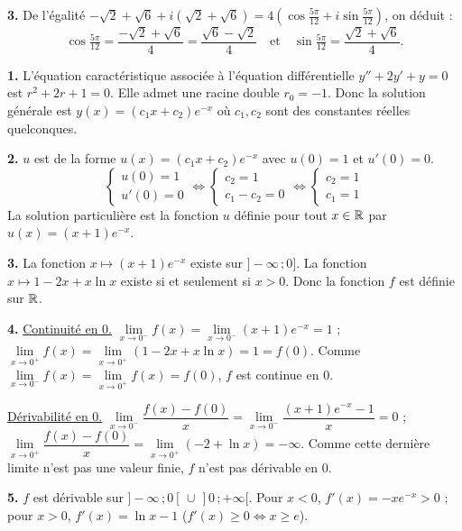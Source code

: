 \documentclass[11pt]{article}
\begin{document}
\textbf{3.} De l'égalité $-\sqrt{2} + \sqrt{6} + i(\sqrt{2} + \sqrt{6}) = 4\left(\cos\tfrac{5\pi}{12} + i\sin\tfrac{5\pi}{12}\right)$, on déduit :
\[ \cos\tfrac{5\pi}{12} = \frac{-\sqrt{2} + \sqrt{6}}{4} = \frac{\sqrt{6} - \sqrt{2}}{4} \quad \text{et} \quad \sin\tfrac{5\pi}{12} = \frac{\sqrt{2} + \sqrt{6}}{4}. \]

\prob{}

\textbf{1.} L'équation caractéristique associée à l'équation différentielle $y'' + 2y' + y = 0$ est $r^2 + 2r + 1 = 0$. Elle admet une racine double $r_0 = -1$. Donc la solution générale est $y(x) = (c_1 x + c_2)e^{-x}$ où $c_1, c_2$ sont des constantes réelles quelconques.

\textbf{2.} $u$ est de la forme $u(x) = (c_1 x + c_2)e^{-x}$ avec $u(0) = 1$ et $u'(0) = 0$.
\[ \begin{cases} u(0) = 1 \\ u'(0) = 0 \end{cases} \Longleftrightarrow \begin{cases} c_2 = 1 \\ c_1 - c_2 = 0 \end{cases} \Longleftrightarrow \begin{cases} c_2 = 1 \\ c_1 = 1 \end{cases} \]
La solution particulière est la fonction $u$ définie pour tout $x \in \mathbb{R}$ par $u(x) = (x + 1)e^{-x}$.

\textbf{3.} La fonction $x \mapsto (x + 1)e^{-x}$ existe sur $]-\infty\,;0]$. La fonction $x \mapsto 1 - 2x + x\ln x$ existe si et seulement si $x > 0$. Donc la fonction $f$ est définie sur $\mathbb{R}$.

\textbf{4.} \underline{Continuité en 0.} $\lim\limits_{x\to 0^-} f(x) = \lim\limits_{x\to 0^-}(x + 1)e^{-x} = 1$ ; $\lim\limits_{x\to 0^+} f(x) = \lim\limits_{x\to 0^+}(1 - 2x + x\ln x) = 1 = f(0)$. Comme $\lim\limits_{x\to 0^-} f(x) = \lim\limits_{x\to 0^+} f(x) = f(0)$, $f$ est continue en 0.

\underline{Dérivabilité en 0.} $\lim\limits_{x\to 0^-}\dfrac{f(x) - f(0)}{x} = \lim\limits_{x\to 0^-}\dfrac{(x + 1)e^{-x} - 1}{x} = 0$ ; $\lim\limits_{x\to 0^+}\dfrac{f(x) - f(0)}{x} = \lim\limits_{x\to 0^+}(-2 + \ln x) = -\infty$. Comme cette dernière limite n'est pas une valeur finie, $f$ n'est pas dérivable en 0.

\textbf{5.} $f$ est dérivable sur $]-\infty\,;0[\,\cup\,]0\,;+\infty[$. Pour $x < 0$, $f'(x) = -xe^{-x} > 0$ ; pour $x > 0$, $f'(x) = \ln x - 1$ ($f'(x) \ge 0 \Leftrightarrow x \ge e$).
\end{document}
